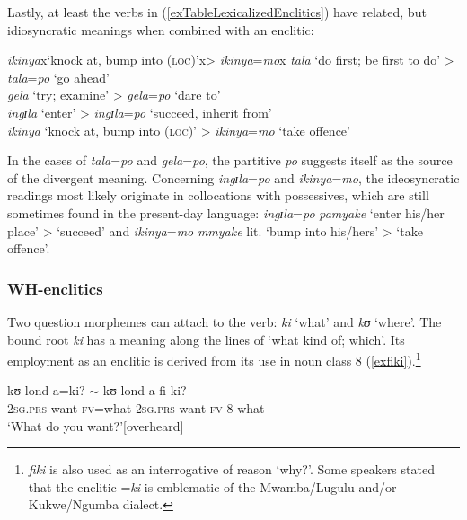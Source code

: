 Lastly, at least the verbs in (\ref{exTableLexicalizedEnclitics}) have related, but idiosyncratic meanings when combined with an enclitic:
\begin{exe}
	\ex \label{exTableLexicalizedEnclitics}
	\begin{tabbing}
		\textit{ikinya}x\=\lq knock at, bump into (\textsc{loc})'x\= > \textit{ikinya}=\textit{mo}x\=\kill %
		\textit{tala} \> \lq do first; be first to do' \> > \textit{tala}=\textit{po} \> \lq go ahead'\\
		\textit{gela} \> \lq try; examine' \> > \textit{gela}=\textit{po} \> \lq dare to'\\
		\textit{ingɪla} \> \lq enter' \> > \textit{ingɪla}=\textit{po} \> \lq succeed, inherit from'\\
		\textit{ikinya} \> \lq knock at, bump into (\textsc{loc})' \> > \textit{ikinya}=\textit{mo} \> \lq take offence'
	\end{tabbing}
\end{exe}

In the cases of \textit{tala}=\textit{po} and \textit{gela}=\textit{po}, the partitive \textit{po} suggests itself as the source of the divergent meaning. Concerning \textit{ingɪla}=\textit{po} and \textit{ikinya}=\textit{mo}, the ideosyncratic readings most likely originate in collocations with  possessives, which are still sometimes found in the present-day language: \textit{ingɪla}=\textit{po} \textit{pamyake} \lq enter his/her place' > \lq succeed' and \textit{ikinya}=\textit{mo} \textit{mmyake} lit. \lq bump into his/hers' > \lq take offence'.

\newpage 
\subsubsection{WH-enclitics}\label{WHenclitics}
Two question morphemes can attach to the verb: \textit{ki} `what' and \textit{kʊ} `where'. The bound root \textit{ki} has a meaning along the lines of `what kind of; which'. Its employment as an enclitic is derived from its use in noun class 8 (\ref{exfiki}).\footnote{\textit{fiki} is also used as an interrogative of reason `why?'. Some speakers stated that the enclitic =\textit{ki} is emblematic of the Mwamba/Lugulu and/or Kukwe/Ngumba dialect.}

\begin{exe}
	\ex \label{exfiki}
	\gll kʊ-lond-a=ki? $\sim$ kʊ-lond-a fi-ki?\\
	\textsc{2sg.prs}-want-\textsc{fv}=what {} \textsc{2sg.prs}-want-\textsc{fv} 8-what\\
	\glt `What do you want?'[overheard]
\end{exe}

